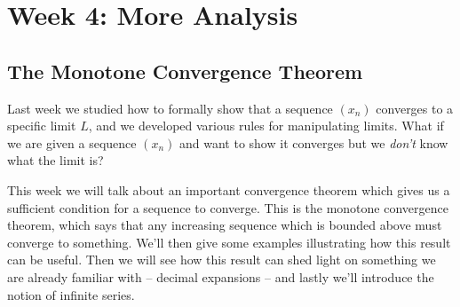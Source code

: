 \documentclass[11pt,dvipsnames]{book}
\numberwithin{equation}{section} %
\numberwithin{figure}{section} %
\numberwithin{table}{section} %
\begin{document}




\pagestyle{empty} %

 \tableofcontents %

\cleardoublepage %

\pagestyle{fancy} %




\part{Week 4: More Analysis}




\setcounter{chapter}{6}


\chapter{The Monotone Convergence Theorem}

\setcounter{page}{1}



Last week we studied how to formally show that a sequence $(x_{n})$ converges to a specific limit $L$, and we developed various rules for manipulating limits. What if we are given a sequence $(x_{n})$ and want to show it converges but we {\it don't} know what the limit is? 

This week we will talk about an important convergence theorem which gives us a sufficient condition for a sequence to  converge. This is the monotone convergence theorem, which says that any increasing sequence which is bounded above must converge to something. %
We'll then give some examples illustrating how this result can be useful. Then we will see how this result can shed light on something we are already familiar with -- decimal expansions -- and lastly we'll introduce the notion of infinite series.
\end{document}
